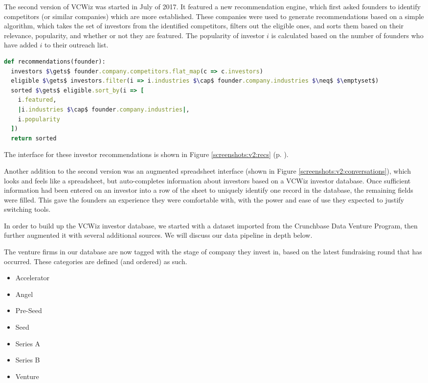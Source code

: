The second version of VCWiz was started in July of 2017. It featured a new recommendation engine, which first asked founders to identify competitors (or similar companies) which are more established. These companies were used to generate recommendations based on a simple algorithm, which takes the set of investors from the identified competitors, filters out the eligible ones, and sorts them based on their relevance, popularity, and whether or not they are featured. The popularity of investor $i$ is calculated based on the number of founders who have added $i$ to their outreach list.

\begin{lstlisting}[frame=single,mathescape=true,language=Ruby,basicstyle=\footnotesize,columns=fullflexible]
def recommendations(founder):
  investors $\gets$ founder.company.competitors.flat_map(c => c.investors)
  eligible $\gets$ investors.filter(i => i.industries $\cap$ founder.company.industries $\neq$ $\emptyset$)
  sorted $\gets$ eligible.sort_by(i => [
    i.featured,
    |i.industries $\cap$ founder.company.industries|,
    i.popularity
  ])
  return sorted
\end{lstlisting}

The interface for these investor recommendations is shown in Figure \ref{screenshots:v2:recs} (p. \pageref{screenshots:v2:recs}).

Another addition to the second version was an augmented spreadsheet interface (shown in Figure \ref{screenshots:v2:conversations}), which looks and feels like a spreadsheet, but auto-completes information about investors based on a VCWiz investor database. Once sufficient information had been entered on an investor into a row of the sheet to uniquely identify one record in the database, the remaining fields were filled. This gave the founders an experience they were comfortable with, with the power and ease of use they expected to justify switching tools.

In order to build up the VCWiz investor database, we started with a dataset imported from the Crunchbase Data Venture Program, then further augmented it with several additional sources. We will discuss our data pipeline in depth below.

The venture firms in our database are now tagged with the stage of company they invest in, based on the latest fundraising round that has occurred. These categories are defined (and ordered) as such.

\begin{multicols}{2}
\begin{itemize}
  \item Accelerator
  \item Angel
  \item Pre-Seed
  \item Seed
  \item Series A
  \item Series B
  \item Venture
\end{itemize}
\end{multicols}

